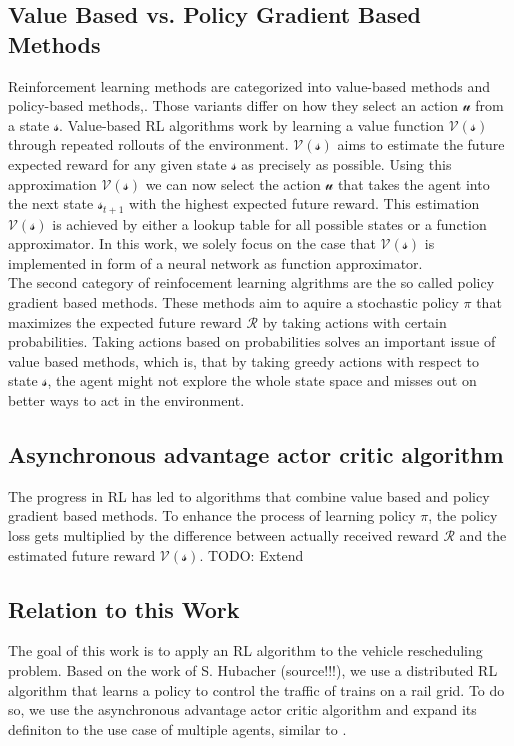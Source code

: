 \subsection*{Value Based vs. Policy Gradient Based Methods}\label{value_policy_based_methods}
Reinforcement learning methods are categorized into value-based methods and policy-based methods\cite{tdlearning},\cite{policygradient}. Those variants differ on how they select an action $\mathcal{u}$ from a state $\mathcal{s}$.
Value-based RL algorithms work by learning a value function $\mathcal{V(s)}$ through repeated rollouts of the environment. $\mathcal{V(s)}$ aims to estimate the future expected reward for any given state $\mathcal{s}$ as precisely as possible. Using this approximation $\mathcal{V(s)}$ we can now select the action $\mathcal{u}$ that takes the agent into the next state $\mathcal{s}_{t+1}$ with the highest expected future reward. This estimation $\mathcal{V(s)}$ is achieved by either a lookup table for all possible states or a function approximator. In this work, we solely focus on the case that $\mathcal{V(s)}$ is implemented in form of a neural network as function approximator.\\
The second category of reinfocement learning algrithms are the so called policy gradient based methods. These methods aim to aquire a stochastic policy $\pi$ that maximizes the expected future reward $\mathcal{R}$ by taking actions with certain probabilities. Taking actions based on probabilities solves an important issue of value based methods, which is, that by taking greedy actions with respect to state  $\mathcal{s}$, the agent might not explore the whole state space and misses out on better ways to act in the environment.


\subsection*{Asynchronous advantage actor critic algorithm}\label{a3c_intro}
The progress in RL has led to algorithms that combine value based and policy gradient based methods. To enhance the process of learning policy $\pi$, the policy loss gets multiplied by the difference between actually received reward $\mathcal{R}$ and the estimated future reward $\mathcal{V(s)}$. 
TODO: Extend


\subsection*{Relation to this Work}\label{rl_relation_work}
The goal of this work is to apply an RL algorithm to the vehicle rescheduling problem. Based on the work of S. Hubacher (source!!!), we use a distributed RL algorithm that learns a policy to control the traffic of trains on a rail grid. To do so, we use the asynchronous advantage actor critic algorithm \cite{a3c} and expand its definiton to the use case of multiple agents, similar to \cite{marltraffica3c}.

